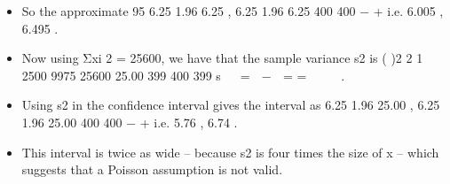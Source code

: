 \documentclass[a4paper,12pt]{article}
\begin{document}
\begin{enumerate}
\begin{itemize}
\item So the approximate 95%
6.25 1.96 6.25 , 6.25 1.96 6.25
400 400
− +
  i.e. 6.005 , 6.495 .
\item Now using Σxi
2 = 25600, we have that the sample variance s2 is
( )2
2 1 2500 9975 25600 25.00
399 400 399
s
 
=  −  = =
   
 
.
\item Using s2 in the confidence interval gives the interval as
6.25 1.96 25.00 , 6.25 1.96 25.00
400 400
− +
  i.e. 5.76 , 6.74 .
\item This interval is twice as wide – because s2 is four times the size of x – which
suggests that a Poisson assumption is not valid.
\end{itemize}
\end{enumerate}
\end{document}
